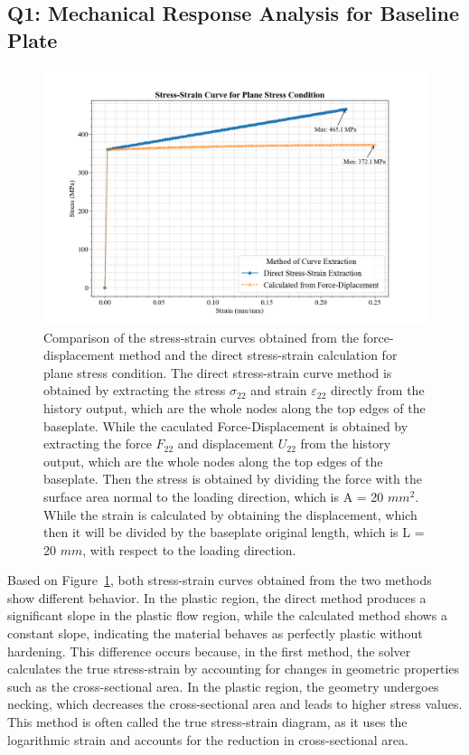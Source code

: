 \documentclass[12pt]{article}
\begin{document}
\subsection*{Q1: Mechanical Response Analysis for Baseline Plate}
\begin{figure}[H]
    \centering
    \includegraphics[width=1\textwidth]{visualize_tensileGraph/res/comparison_direct_calculated.png}
    \caption{Comparison of
    the stress-strain curves obtained from the force-displacement method and the direct stress-strain calculation
    for plane stress condition. The direct stress-strain curve method is obtained 
    by extracting the stress $\sigma_{22}$ and strain $\varepsilon_{22}$ directly from the 
    history output, which are the whole nodes along the top edges of the baseplate. While the caculated
    Force-Displacement is obtained by extracting the force 
    $F_{22}$ and displacement $U_{22}$ from the history output, which are the whole nodes along the top edges of the baseplate.
    Then the stress is obtained by dividing the force with the surface area
    normal to the loading direction, which is A = 20 $mm^2$. While the strain is calculated by obtaining the displacement,
    which then it will be divided by the baseplate original length, which is L = 20 $mm$, with respect to the loading
    direction.} 
    \label{fig:ComparisonDirectCalculated}  
\end{figure}
    \hspace{2em}Based on Figure~\ref{fig:ComparisonDirectCalculated}, both stress-strain curves obtained from the two 
    methods show different behavior. In the plastic region, the direct method produces a significant slope 
    in the plastic flow region, while the calculated method shows a constant slope, 
    indicating the material behaves as perfectly plastic without hardening. 
    This difference occurs because, in the first method, the solver calculates the true stress-strain 
    by accounting for changes in geometric properties such as the cross-sectional area. In the plastic 
    region, the geometry undergoes necking, which decreases the cross-sectional area and leads to higher 
    stress values. This method is often called the true stress-strain diagram, as it uses the logarithmic 
    strain and accounts for the reduction in cross-sectional area.
\end{document}
